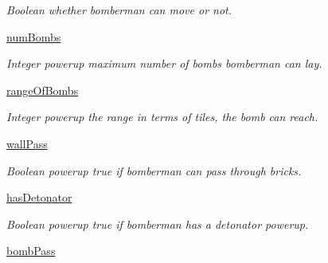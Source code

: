 \begin{DoxyCompactItemize}
\begin{DoxyCompactList}\small\item\em Boolean whether bomberman can move or not. \end{DoxyCompactList}\item 
\hypertarget{classsrc_1_1bomberman_1_1_bomberman_a2cb3572c62ccccb8eb2383145d0d4f2e}{}\hyperlink{classsrc_1_1bomberman_1_1_bomberman_a2cb3572c62ccccb8eb2383145d0d4f2e}{num\+Bombs}\label{classsrc_1_1bomberman_1_1_bomberman_a2cb3572c62ccccb8eb2383145d0d4f2e}

\begin{DoxyCompactList}\small\item\em Integer powerup maximum number of bombs bomberman can lay. \end{DoxyCompactList}\item 
\hypertarget{classsrc_1_1bomberman_1_1_bomberman_a60e8708ab7b666aa01aeb3cf0660db92}{}\hyperlink{classsrc_1_1bomberman_1_1_bomberman_a60e8708ab7b666aa01aeb3cf0660db92}{range\+Of\+Bombs}\label{classsrc_1_1bomberman_1_1_bomberman_a60e8708ab7b666aa01aeb3cf0660db92}

\begin{DoxyCompactList}\small\item\em Integer powerup the range in terms of tiles, the bomb can reach. \end{DoxyCompactList}\item 
\hypertarget{classsrc_1_1bomberman_1_1_bomberman_a8f1c6898c8d82b94228c5d4361c389a4}{}\hyperlink{classsrc_1_1bomberman_1_1_bomberman_a8f1c6898c8d82b94228c5d4361c389a4}{wall\+Pass}\label{classsrc_1_1bomberman_1_1_bomberman_a8f1c6898c8d82b94228c5d4361c389a4}

\begin{DoxyCompactList}\small\item\em Boolean powerup true if bomberman can pass through bricks. \end{DoxyCompactList}\item 
\hypertarget{classsrc_1_1bomberman_1_1_bomberman_af3633e53e0443adbc59816892d516065}{}\hyperlink{classsrc_1_1bomberman_1_1_bomberman_af3633e53e0443adbc59816892d516065}{has\+Detonator}\label{classsrc_1_1bomberman_1_1_bomberman_af3633e53e0443adbc59816892d516065}

\begin{DoxyCompactList}\small\item\em Boolean powerup true if bomberman has a detonator powerup. \end{DoxyCompactList}\item 
\hypertarget{classsrc_1_1bomberman_1_1_bomberman_aca70e55b92691117f315e82d444188d4}{}\hyperlink{classsrc_1_1bomberman_1_1_bomberman_aca70e55b92691117f315e82d444188d4}{bomb\+Pass}\label{classsrc_1_1bomberman_1_1_bomberman_aca70e55b92691117f315e82d444188d4}


\end{DoxyCompactItemize}
